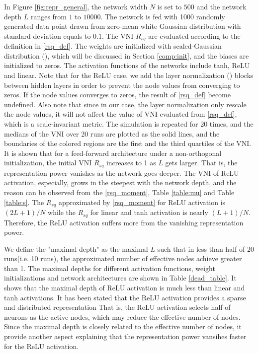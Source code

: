 In Figure \ref{fig:repr_general}, the network width $N$ is set to $500$ and the network depth
$L$ ranges from $1$ to $10000$. The network is fed with 1000 randomly generated data point
drawn from zero-mean white Gaussian distribution with standard deviation equals to $0.1$.
The VNI $R_{sq}$ are evaluated according to the definition in \eqref{rsq_def}.
The weights are initialized with scaled-Gaussian distribution (\cite{xavier, he}), which
will be discussed in Section \ref{comp:init}, and the biases are initialized to zeros.
The activation functions of the networks include tanh, ReLU and linear. Note that for the
ReLU case, we add the layer normalization (\cite{layer_norm}) blocks between hidden layers
in order to prevent the node values from converging to zeros. If the node values converges
to zeros, the result of \eqref{rsq_def} become undefined.
Also note that since in our case, the layer
normalization only rescale the node values, it will not affect the value of VNI evaluated
from \eqref{rsq_def}, which is a scale-invariant metric.
The simulation is repeated for 20 times, and the medians of the VNI over 20 runs are plotted as
the solid lines, and the boundaries of the colored regions are the first and the third
quartiles of the VNI. It is shown that for a feed-forward architecture under a non-orthogonal
initialization, the initial VNI $R_{sq}$ increases to 1 as $L$ gets larger. That is,
the representation power vanishes as the network goes deeper. The VNI of ReLU activation,
especially, grows in the steepest with the network depth, and the reason can be observed from
the \eqref{rsq_moment}, Table \ref{table:mu} and Table \ref{table:s}. The $R_{sq}$ 
approximated by \eqref{rsq_moment} for ReLU activation is $(2L+1)/N$ while the $R_{sq}$
for linear and tanh activation is nearly $(L+1)/N$.
Therefore, the ReLU activation suffers more from the vanishing representation power.

We define the "maximal depth" as the maximal $L$ such that in less than half of 20
runs(i.e. 10 runs), the approximated number of effective nodes achieve greater than 1.
The maximal depths for different activation functions, weight initializations and network
architectures are shown in Table \ref{dead_table}. It shows that the maximal depth of ReLU
activation is much less than linear and tanh activations. It has been stated
\cite{relu_sparse} that the ReLU activation provides a sparse and distributed representation
That is, the ReLU activation selects half of neurons as the active nodes, which may reduce the
effective number of nodes. Since the maximal depth is closely related to the effective number
of nodes, it provide another aspect explaining that the representation power vansihes
faster for the ReLU activation.

